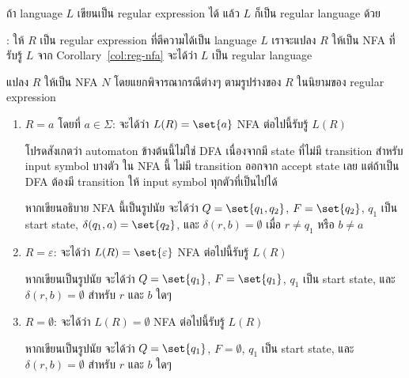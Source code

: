 \begin{lemma}\label{lemma:regexp-dfa}
ถ้า language $L$ เขียนเป็น regular expression ได้ แล้ว $L$ ก็เป็น regular language ด้วย

: ให้ $R$ เป็น regular expression ที่ตีความได้เป็น language $L$ \enskip เราจะแปลง $R$ ให้เป็น NFA ที่รับรู้ $L$ \enskip จาก Corollary~\ref{col:reg-nfa} จะได้ว่า $L$ เป็น regular language
\begin{pf}
แปลง $R$ ให้เป็น NFA $N$ โดยแยกพิจารณากรณีต่างๆ ตามรูปร่างของ $R$ ในนิยามของ regular expression
\begin{enumerate}
\item $R=a$ โดยที่ $a\in\Sigma$: จะได้ว่า $L(R)=\set{a}$ \enskip NFA ต่อไปนี้รับรู้ $L(R)$
\begin{center}
\end{center}
โปรดสังเกตว่า automaton ข้างต้นนี้ไม่ใช่ DFA เนื่องจากมี state ที่ไม่มี transition สำหรับ input symbol บางตัว \enskip ใน NFA นี้ ไม่มี transition ออกจาก accept state เลย แต่ถ้าเป็น DFA ต้องมี transition ให้ input symbol ทุกตัวที่เป็นไปได้

หากเขียนอธิบาย NFA นี้เป็นรูปนัย จะได้ว่า $Q=\set{q_1,q_2}$, $F=\set{q_2}$, $q_1$ เป็น start state, $\delta(q_1,a)=\set{q_2}$, และ $\delta(r,b)=\emptyset$ เมื่อ $r\neq q_1$ หรือ $b\neq a$

\item $R=\varepsilon$: จะได้ว่า $L(R)=\set{\varepsilon}$ \enskip NFA ต่อไปนี้รับรู้ $L(R)$
\begin{center}
\end{center}
หากเขียนเป็นรูปนัย จะได้ว่า $Q=\set{q_1}$, $F=\set{q_1}$, $q_1$ เป็น start state, และ $\delta(r,b)=\emptyset$ สำหรับ $r$ และ $b$ ใดๆ

\item $R=\emptyset$: จะได้ว่า $L(R)=\emptyset$ \enskip NFA ต่อไปนี้รับรู้ $L(R)$
\begin{center}
\end{center}
หากเขียนเป็นรูปนัย จะได้ว่า $Q=\set{q_1}$, $F=\emptyset$, $q_1$ เป็น start state, และ $\delta(r,b)=\emptyset$ สำหรับ $r$ และ $b$ ใดๆ


\end{enumerate}
\end{pf}
\end{lemma}
